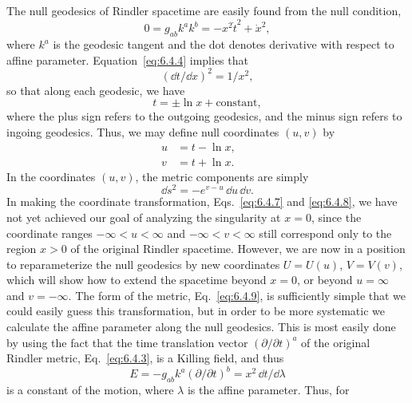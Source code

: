 The null geodesics of Rindler spacetime are easily found from the null condition,
\begin{equation}
  0=g_{ab}k^ak^b=-x^2\dot t^2+\dot x^2,
  \tag{6.4.4}\label{eq:6.4.4}
\end{equation}
where \(k^a\) is the geodesic tangent and the dot denotes derivative with
respect to affine parameter. Equation~\eqref{eq:6.4.4} implies that
\begin{equation}
  (\dd t/\dd x)^2=1/x^2,
  \tag{6.4.5}\label{eq:6.4.5}
\end{equation}
so that along each geodesic, we have
\begin{equation}
  t=\pm\ln x+\text{constant},
  \tag{6.4.6}\label{eq:6.4.6}
\end{equation}
where the plus sign refers to the outgoing geodesics, and the minus sign refers
to ingoing geodesics. Thus, we may define null coordinates \((u,v)\) by
\begin{align}
  u&=t-\ln x,
  &&\tag{6.4.7}\label{eq:6.4.7}\\
  v&=t+\ln x.
  &&\tag{6.4.8}\label{eq:6.4.8}
\end{align}
In the coordinates \((u,v)\), the metric components are simply
\begin{equation}
  \dd s^2=-e^{v-u}\,\dd u\,\dd v.
  \tag{6.4.9}\label{eq:6.4.9}
\end{equation}
In making the coordinate transformation, Eqs.~\eqref{eq:6.4.7} and
\eqref{eq:6.4.8}, we have not yet achieved our goal of analyzing the singularity
at \(x=0\), since the coordinate ranges \(-\infty<u<\infty\) and
\(-\infty<v<\infty\) still correspond only to the region \(x>0\) of the original
Rindler spacetime. However, we are now in a position to reparameterize the null
geodesics by new coordinates \(U=U(u)\), \(V=V(v)\), which will show how to
extend the spacetime beyond \(x=0\), or beyond \(u=\infty\) and \(v=-\infty\).
The form of the metric, Eq.~\eqref{eq:6.4.9}, is sufficiently simple that we
could easily guess this transformation, but in order to be more systematic we
calculate the affine parameter along the null geodesics. This is most easily done
by using the fact that the time translation vector \((\partial/\partial t)^a\) of
the original Rindler metric, Eq.~\eqref{eq:6.4.3}, is a Killing field, and thus
\begin{equation}
  E=-g_{ab}k^a(\partial/\partial t)^b=x^2\,\dd t/\dd\lambda
  \tag{6.4.10}\label{eq:6.4.10}
\end{equation}
is a constant of the motion, where \(\lambda\) is the affine parameter. Thus, for
